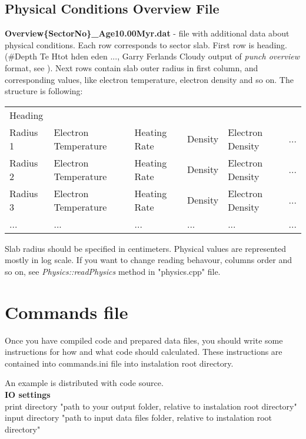 \documentclass[a4paper]{article}
\begin{document}
\subsection{Physical Conditions Overview File}
{\bf Overview\{SectorNo\}\_Age10.00Myr.dat} - file with additional data about physical conditions. Each row
corresponds to sector slab. First row is heading.
(\#Depth		Te	Htot hden eden ..., Garry Ferlands Cloudy output of {\it punch overview}
format, see \cite{Cloudy}).
Next rows contain slab outer radius in first column,
and corresponding values, like electron temperature, electron density and so on.
The structure is following:
\begin{table}[H]
    \begin{tabular}{llllll}
        Heading & & & & & \\
        Radius 1 & Electron Temperature & Heating Rate & Density & Electron Density & ... \\
        Radius 2 & Electron Temperature & Heating Rate & Density & Electron Density & ... \\
        Radius 3 & Electron Temperature & Heating Rate & Density & Electron Density & ... \\
        ... & ... & ... & ... & ... & ... \\
    \end{tabular}
\end{table}
Slab radius should be specified in centimeters. Physical values are represented mostly in log scale.
If you want to change reading behavour, columns order and so on, see {\it Physics::readPhysics} method in "physics.cpp" file.


\section{Commands file}

Once you have compiled code and prepared data files, you should write some 
instructions for how and what code should calculated. These instructions are 
contained into commands.ini file into instalation root directory. 

An example is distributed with code source. \\

{\bf IO settings}\\
print directory "path to your output folder, relative to instalation root directory"\\
input directory "path to input data files folder, relative to instalation root directory"\\
\end{document}
